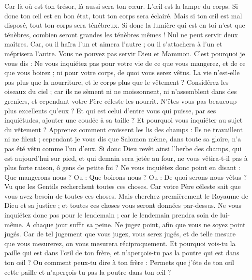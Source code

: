 \begin{multicols}{2}
Car là où est ton trésor, là aussi sera ton cœur.
L'œil est la lampe du corps. Si donc ton œil est en bon état, tout ton corps sera éclairé.
Mais si ton œil est mal disposé, tout ton corps sera ténébreux. Si donc la lumière qui est en toi n'est que ténèbres, combien seront grandes les ténèbres mêmes !
Nul ne peut servir deux maîtres. Car, ou il haïra l'un et aimera l'autre ; ou il s'attachera à l'un et méprisera l'autre. Vous ne pouvez pas servir Dieu et Mammon.
C'est pourquoi je vous dis : Ne vous inquiétez pas pour votre vie de ce que vous mangerez, et de ce que vous boirez ; ni pour votre corps, de quoi vous serez vêtus. La vie n'est-elle pas plus que la nourriture, et le corps plus que le vêtement ?
Considérez les oiseaux du ciel ; car ils ne sèment ni ne moissonnent, ni n'assemblent dans des greniers, et cependant votre Père céleste les nourrit. N'êtes vous pas beaucoup plus excellents qu'eux ?
Et qui est celui d'entre vous qui puisse, par ses inquiétudes, ajouter une coudée à sa taille ?
Et pourquoi vous inquiéter au sujet du vêtement ? Apprenez comment croissent les lis des champs : Ils ne travaillent ni ne filent ;
cependant je vous dis que Salomon même, dans toute sa gloire, n'a pas été vêtu comme l'un d'eux.
Si donc Dieu revêt ainsi l'herbe des champs, qui est aujourd'hui sur pied, et qui demain sera jetée au four, ne vous vêtira-t-il pas à plus forte raison, ô gens de petite foi ?
Ne vous inquiétez donc point en disant : Que mangerons-nous ? Ou : Que boirons-nous ? Ou : De quoi serons-nous vêtus ?
Vu que les Gentils recherchent toutes ces choses. Car votre Père céleste sait que vous avez besoin de toutes ces choses.
Mais cherchez premièrement le Royaume de Dieu et sa justice ; et toutes ces choses vous seront données par-dessus.
Ne vous inquiétez donc pas pour le lendemain ; car le lendemain prendra soin de lui-même. A chaque jour suffit sa peine.
\VerseOne{}Ne jugez point, afin que vous ne soyez point jugés.
Car de tel jugement que vous jugez, vous serez jugés, et de telle mesure que vous mesurerez, on vous mesurera réciproquement.
Et pourquoi vois-tu la paille qui est dans l'œil de ton frère, et n'aperçois-tu pas la poutre qui est dans ton œil ?
Ou comment peux-tu dire à ton frère : Permets que j'ôte de ton œil cette paille et n'aperçois-tu pas la poutre dans ton œil ?

\end{multicols}
